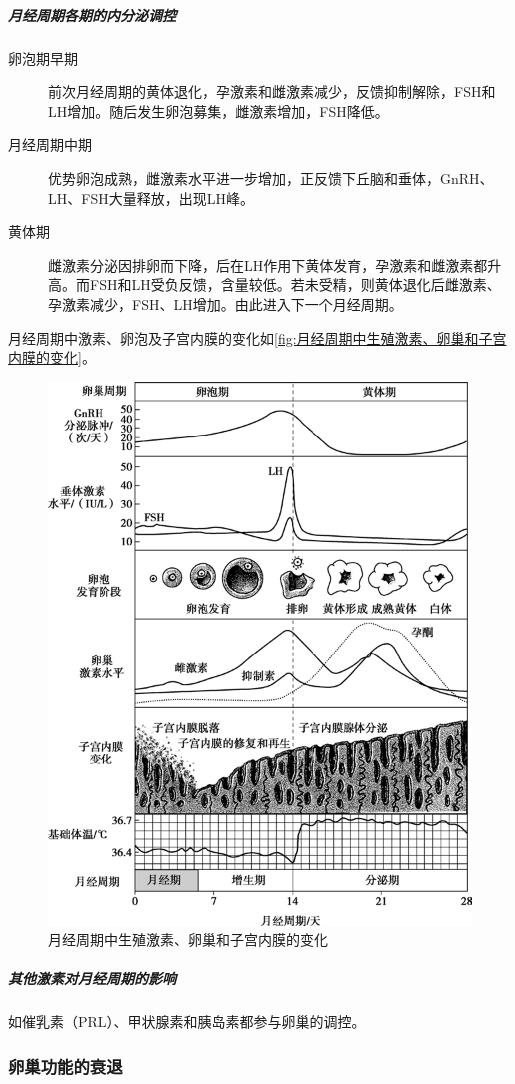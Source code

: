 \subparagraph{月经周期各期的内分泌调控}

\begin{description}
	\item[卵泡期早期] 前次月经周期的黄体退化，孕激素和雌激素减少，反馈抑制解除，FSH和LH增加。随后发生卵泡募集，雌激素增加，FSH降低。
	\item[月经周期中期] 优势卵泡成熟，雌激素水平进一步增加，正反馈下丘脑和垂体，GnRH、LH、FSH大量释放，出现LH峰。
	\item[黄体期] 雌激素分泌因排卵而下降，后在LH作用下黄体发育，孕激素和雌激素都升高。而FSH和LH受负反馈，含量较低。若未受精，则黄体退化后雌激素、孕激素减少，FSH、LH增加。由此进入下一个月经周期。
\end{description}

月经周期中激素、卵泡及子宫内膜的变化如\autoref{fig:月经周期中生殖激素、卵巢和子宫内膜的变化}。

\begin{figure}[htbp]
	\centering
	\includegraphics[width=0.7\linewidth]{Pics/月经周期中生殖激素、卵巢和子宫内膜的变化}
	\caption{月经周期中生殖激素、卵巢和子宫内膜的变化}
	\label{fig:月经周期中生殖激素、卵巢和子宫内膜的变化}
\end{figure}

\subparagraph{其他激素对月经周期的影响}

如催乳素（PRL）、甲状腺素和胰岛素都参与卵巢的调控。

\subsubsection{卵巢功能的衰退}

